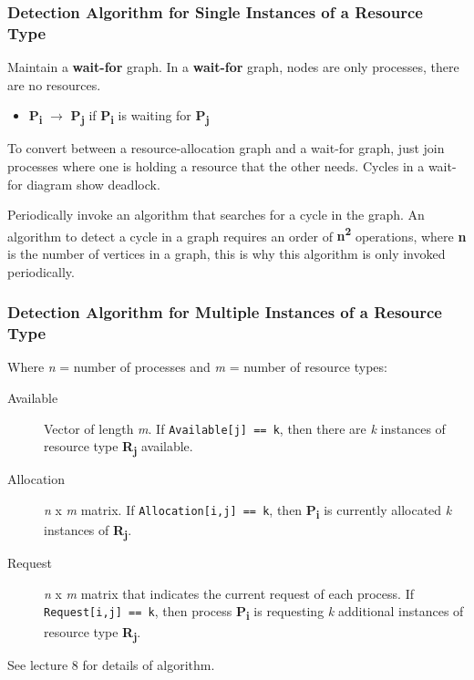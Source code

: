 \documentclass{article}%
\begin{document}
\subsubsection{Detection Algorithm for Single Instances of a Resource Type}
\label{sec:org7c77c54}
Maintain a \textbf{wait-for} graph.
In a \textbf{wait-for} graph, nodes are only processes, there are no resources.

\begin{itemize}
\item \textbf{P\textsubscript{i}} \(\rightarrow\) \textbf{P\textsubscript{j}} if \textbf{P\textsubscript{i}} is waiting for \textbf{P\textsubscript{j}}
\end{itemize}

To convert between a resource-allocation graph and a wait-for graph, just join processes where one is holding a resource that the other needs.
Cycles in a wait-for diagram show deadlock.

Periodically invoke an algorithm that searches for a cycle in the graph.
An algorithm to detect a cycle in a graph requires an order of \textbf{n\textsuperscript{2}} operations, where \textbf{n} is the number of vertices in a graph, this is why this algorithm is only invoked periodically.

\subsubsection{Detection Algorithm for Multiple Instances of a Resource Type}
\label{sec:orgf38b62c}
Where \emph{n} = number of processes and \emph{m} = number of resource types:

\begin{description}
\item[{Available}] Vector of length \emph{m}. If \texttt{Available[j] == k}, then there are \emph{k} instances of resource type \textbf{R\textsubscript{j}} available.
\item[{Allocation}] \emph{n} x \emph{m} matrix. If \texttt{Allocation[i,j] == k}, then \textbf{P\textsubscript{i}} is currently allocated \emph{k} instances of \textbf{R\textsubscript{j}}.
\item[{Request}] \emph{n} x \emph{m} matrix that indicates the current request of each process. If \texttt{Request[i,j] == k}, then process \textbf{P\textsubscript{i}} is requesting \emph{k} additional instances of resource type \textbf{R\textsubscript{j}}.
\end{description}

See lecture 8 for details of algorithm. 
\end{document}
